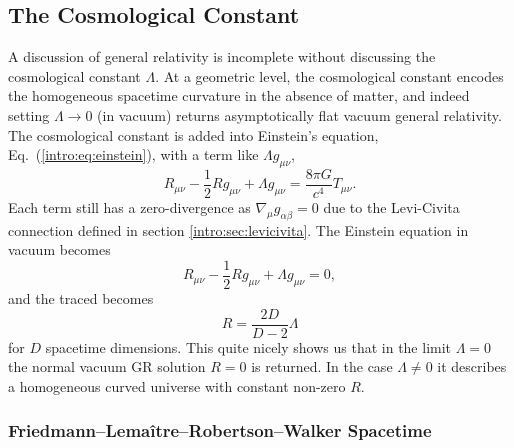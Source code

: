 \subsection{The Cosmological Constant} \label{intro:sec:cosmology}
A discussion of general relativity is incomplete without discussing the cosmological constant $\Lambda$. At a geometric level, the cosmological constant encodes the homogeneous spacetime curvature in the absence of matter, and indeed setting $\Lambda\rightarrow 0$ (in vacuum) returns asymptotically flat vacuum general relativity. The cosmological constant is added into Einstein's equation, Eq.~(\ref{intro:eq:einstein}), with a term like $\Lambda g_{\mu\nu}$,
\begin{equation} \label{intro:eq:einsteinlambda}
R_{\mu\nu}-\frac{1}{2}Rg_{\mu\nu}  +  \Lambda g_{\mu\nu} = \frac{8 \pi G}{c^4}T_{\mu\nu}.
\end{equation}
Each term still has a zero-divergence as $\nabla_\mu g_{\alpha\beta}=0$ due to the Levi-Civita connection defined in section \ref{intro:sec:levicivita}. The Einstein equation in vacuum becomes
\begin{equation}
R_{\mu\nu}-\frac{1}{2}Rg_{\mu\nu} + \Lambda g_{\mu\nu} = 0,
\end{equation}
and the traced becomes
\begin{equation}
R = \frac{2D}{D-2}\Lambda
\end{equation}
for $D$ spacetime dimensions. This quite nicely shows us that in the limit $\Lambda=0$ the normal vacuum GR solution $R=0$ is returned. In the case $\Lambda\neq 0$ it describes a homogeneous curved universe with constant non-zero $R$.

\subsubsection*{Friedmann–Lemaître–Robertson–Walker Spacetime}

